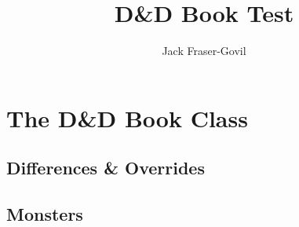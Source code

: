\documentclass[theme=dnd,size=9pt]{rpgbook}
\title{D\&D Book Test}
\author{Jack Fraser-Govil}
\begin{document}
   



   \part{The D\&D Book Class}

		\chapter{Differences \& Overrides}

		\chapter{Monsters}
\end{document}
